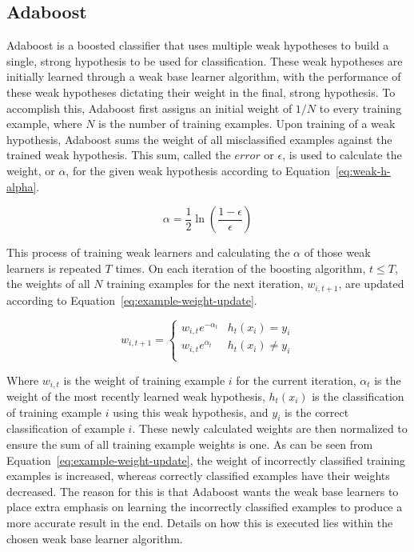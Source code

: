 \documentclass[a4paper]{article}
\begin{document}
\subsection{Adaboost}
Adaboost is a boosted classifier that uses multiple weak hypotheses to build a single, strong hypothesis to be used for classification. These weak hypotheses are initially learned through a weak base learner algorithm, with the performance of these weak hypotheses dictating their weight in the final, strong hypothesis. To accomplish this, Adaboost first assigns an initial weight of $1/N$ to every training example, where $N$ is the number of training examples. Upon training of a weak hypothesis, Adaboost sums the weight of all misclassified examples against the trained weak hypothesis.  This sum, called the $error$ or $\epsilon$, is used to calculate the weight, or $\alpha$, for the given weak hypothesis according to Equation~\ref{eq:weak-h-alpha}.

\begin{equation}
    \label{eq:weak-h-alpha}
    \alpha = \frac{1}{2}\ln\left(\frac{1-\epsilon}{\epsilon}\right)
\end{equation}

This process of training weak learners and calculating the $\alpha$ of those weak learners is repeated $T$ times. On each iteration of the boosting algorithm, $t \le T$, the weights of all $N$ training examples for the next iteration, $w_{i, t+1}$, are updated according to Equation~\ref{eq:example-weight-update}.

\begin{equation}
    \label{eq:example-weight-update}
    w_{i, t+1} =
    \begin{cases} 
      w_{i,t}e^{-\alpha_t} & h_t(x_i) = y_i \\
      w_{i,t}e^{\alpha_t} & h_t(x_i) \ne y_i \\
   \end{cases}
\end{equation}

Where $w_{i,t}$ is the weight of training example $i$ for the current iteration, $\alpha_t$ is the weight of the most recently learned weak hypothesis, $h_t(x_i)$ is the classification of training example $i$ using this weak hypothesis, and $y_i$ is the correct classification of example $i$. These newly calculated weights are then normalized to ensure the sum of all training example weights is one. As can be seen from Equation~\ref{eq:example-weight-update}, the weight of incorrectly classified training examples is increased, whereas correctly classified examples have their weights decreased. The reason for this is that Adaboost wants the weak base learners to place extra emphasis on learning the incorrectly classified examples to produce a more accurate result in the end. Details on how this is executed lies within the chosen weak base learner algorithm. 
\end{document}
